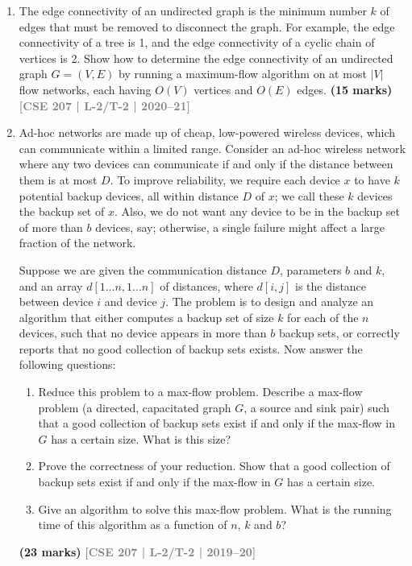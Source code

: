\documentclass[12pt]{article}
\newcommand{\yr}[1]{\hfill\textcolor{gray}{\small\textbf{[#1]}}}
\newcommand{\mk}[1]{\textcolor{orange!70!black}{\small\textbf{(#1 marks)}}}
\begin{document}
\begin{enumerate}
\item The edge connectivity of an undirected graph is the minimum number $k$ of edges that must be removed to disconnect the graph. For example, the edge connectivity of a tree is 1, and the edge connectivity of a cyclic chain of vertices is 2. Show how to determine the edge connectivity of an undirected graph $G = (V, E)$ by running a maximum-flow algorithm on at most $|V|$ flow networks, each having $O(V)$ vertices and $O(E)$ edges.
\mk{15} \yr{CSE 207 | L-2/T-2 | 2020--21}


\item Ad-hoc networks are made up of cheap, low-powered wireless devices, which can communicate within a limited range. Consider an ad-hoc wireless network where any two devices can communicate if and only if the distance between them is at most $D$. To improve reliability, we require each device $x$ to have $k$ potential backup devices, all within distance $D$ of $x$; we call these $k$ devices the backup set of $x$. Also, we do not want any device to be in the backup set of more than $b$ devices, say; otherwise, a single failure might affect a large fraction of the network.

\medskip

\noindent Suppose we are given the communication distance $D$, parameters $b$ and $k$, and an array $d[1 \dots n, 1 \dots n]$ of distances, where $d[i, j]$ is the distance between device $i$ and device $j$. The problem is to design and analyze an algorithm that either computes a backup set of size $k$ for each of the $n$ devices, such that no device appears in more than $b$ backup sets, or correctly reports that no good collection of backup sets exists. Now answer the following questions: 

\begin{enumerate}
    \item Reduce this problem to a max-flow problem. Describe a max-flow problem (a directed, capacitated graph $G$, a source and sink pair) such that a good collection of backup sets exist if and only if the max-flow in $G$ has a certain size. What is this size?
    \item Prove the correctness of your reduction. Show that a good collection of backup sets exist if and only if the max-flow in $G$ has a certain size.
    \item Give an algorithm to solve this max-flow problem. What is the running time of this algorithm as a function of $n$, $k$ and $b$?
\end{enumerate}
\mk{23} \yr{CSE 207 | L-2/T-2 | 2019--20}



\end{enumerate}
\end{document}
